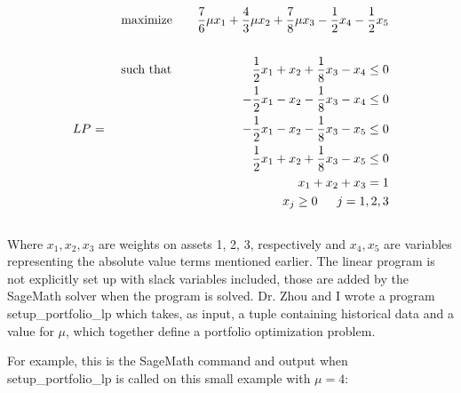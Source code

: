 \documentclass{article}
\begin{document}
\begin{align*}
&\text {} &&\text{maximize}  &&&\text{$\frac{7}{6}\mu x_1 + \frac{4}{3}\mu x_2 + \frac{7}{8}\mu x_3 - \frac{1}{2} x_4 - \frac{1}{2}x_5$}\\
\\
&\text{}&&\text{such that}  &&&\text{$\frac{1}{2}x_1 + x_2 +  \frac{1}{8}x_3 - x_4 \leq 0$}\\
&\text{}&&\text{}  &&&\text{$-\frac{1}{2}x_1 - x_2 -  \frac{1}{8}x_3 - x_4 \leq 0$}\\
&\text{$LP $ = }&&\text{}  &&&\text{$-\frac{1}{2}x_1 - x_2 -  \frac{1}{8}x_3 - x_5 \leq 0$}\\
&\text{}&&\text{}  &&&\text{$\frac{1}{2}x_1 + x_2 +  \frac{1}{8}x_3 - x_5 \leq 0$}\\
&\text{}&&\text{}  &&&\text{$x_1 + x_2 + x_3 = 1$}\\
&\text{}&&\text{}  &&&\text{$x_j \geq 0$ \hspace{9pt} $j = 1,2,3$}
\end{align*}
\\

Where $x_1, x_2, x_3$ are weights on assets 1, 2, 3, respectively and $x_4, x_5$ are variables representing the absolute value terms mentioned earlier. The linear program is not explicitly set up with slack variables included, those are added by the SageMath solver when the program is solved. Dr. Zhou and I wrote a program {\selectfont setup\_portfolio\_lp} which takes, as input, a tuple containing historical data and a value for $\mu$, which together define a portfolio optimization problem.

For example, this is the SageMath command and output when\\ {\selectfont setup\_portfolio\_lp} is called on this small example with $\mu = 4$:
\end{document}

